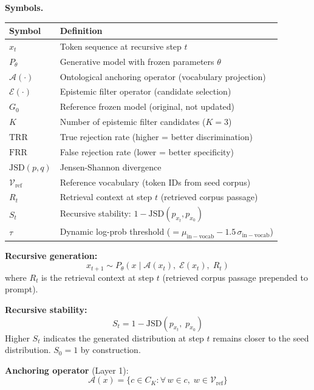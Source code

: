 \documentclass[11pt]{article}
\begin{document}
\noindent\textbf{Symbols.}
\begin{center}
\small
\begin{tabular}{ll}
\toprule
Symbol & Definition \\
\midrule
$x_t$ & Token sequence at recursive step $t$ \\
$P_\theta$ & Generative model with frozen parameters $\theta$ \\
$\mathcal{A}(\cdot)$ & Ontological anchoring operator (vocabulary projection) \\
$\mathcal{E}(\cdot)$ & Epistemic filter operator (candidate selection) \\
$G_0$ & Reference frozen model (original, not updated) \\
$K$ & Number of epistemic filter candidates ($K=3$) \\
$\mathrm{TRR}$ & True rejection rate (higher = better discrimination) \\
$\mathrm{FRR}$ & False rejection rate (lower = better specificity) \\
$\mathrm{JSD}(p, q)$ & Jensen-Shannon divergence \\
$\mathcal{V}_{\mathrm{ref}}$ & Reference vocabulary (token IDs from seed corpus) \\
$R_t$ & Retrieval context at step $t$ (retrieved corpus passage) \\
$S_t$ & Recursive stability: $1 - \mathrm{JSD}(p_{x_t}, p_{x_0})$ \\
$\tau$ & Dynamic log-prob threshold ($= \mu_{\mathrm{in-vocab}} - 1.5\,\sigma_{\mathrm{in-vocab}}$) \\
\bottomrule
\end{tabular}
\end{center}

\noindent\textbf{Recursive generation:}
\begin{equation}
x_{t+1} \sim P_\theta\!\left(x \mid \mathcal{A}(x_t),\; \mathcal{E}(x_t),\; R_t\right)
\end{equation}
where $R_t$ is the retrieval context at step $t$ (retrieved corpus passage prepended to prompt).

\noindent\textbf{Recursive stability:}
\begin{equation}
S_t = 1 - \mathrm{JSD}(p_{x_t},\; p_{x_0})
\end{equation}
Higher $S_t$ indicates the generated distribution at step $t$ remains closer to the seed distribution. $S_0 = 1$ by construction.

\noindent\textbf{Anchoring operator} (Layer 1):
\begin{equation}
\mathcal{A}(x) = \bigl\{c \in C_K : \forall\, w \in c,\; w \in \mathcal{V}_{\mathrm{ref}}\bigr\}
\end{equation}
\end{document}
